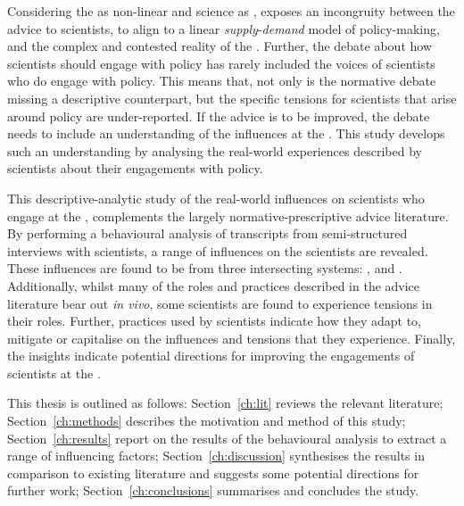 Considering the \SPI{} as non-linear and \CAN{} science as \PNS, exposes an incongruity between the advice to scientists, to align to a linear \emph{supply}-\emph{demand} model of policy-making, and the complex and contested reality of the \CAN{} \SPI. Further, the debate about how scientists should engage with policy has rarely included the voices of scientists who do engage with policy. This means that, not only is the normative debate missing a descriptive counterpart, but the specific tensions for scientists that arise around \CAN{} policy are under-reported. If the advice is to be improved, the debate needs to include an understanding of the influences at the \CAN{} \SPI. This study develops such an understanding by analysing the real-world experiences described by \CAN{} scientists about their engagements with policy.

This descriptive-analytic study of the real-world influences on scientists who engage at the \CAN{} \SPI, complements the largely normative-prescriptive advice literature. By performing a behavioural analysis of transcripts from semi-structured interviews with scientists, a range of influences on the scientists are revealed. These influences are found to be from three intersecting systems: \inte, \know{} and \scip. Additionally, whilst many of the roles and practices described in the advice literature bear out \emph{in vivo}, some scientists are found to experience tensions in their roles. Further, practices used by scientists indicate how they adapt to, mitigate or capitalise on the influences and tensions that they experience. Finally, the insights indicate potential directions for improving the engagements of scientists at the \CAN{} \SPI.

This thesis is outlined as follows: Section~\ref{ch:lit} reviews the relevant literature; Section~\ref{ch:methods} describes the motivation and method of this study; Section~\ref{ch:results} report on the results of the behavioural analysis to extract a range of influencing factors; Section~\ref{ch:discussion} synthesises the results in comparison to existing literature and suggests some potential directions for further work; Section~\ref{ch:conclusions} summarises and concludes the study.

